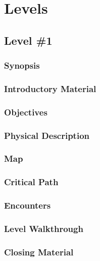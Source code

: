 
\section{Levels}

\subsection{Level \#1}

\subsubsection{Synopsis}

\subsubsection{Introductory Material}

\subsubsection{Objectives}

\subsubsection{Physical Description}

\subsubsection{Map}

\subsubsection{Critical Path}

\subsubsection{Encounters}

\subsubsection{Level Walkthrough}

\subsubsection{Closing Material}

